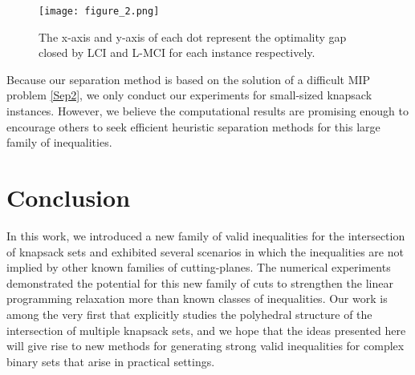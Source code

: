 \begin{figure}
    \centering
    \texttt{[image: figure\_2.png]}
    \caption{The x-axis and y-axis of each dot represent the optimality gap closed by LCI and L-MCI for each instance respectively.}
    \label{fig:lmci_lci}
\end{figure}




Because our separation method is based on the solution of a difficult MIP problem \eqref{Sep2}, we only conduct our experiments for small-sized knapsack instances.  However, we believe the computational results are promising enough to encourage others to seek efficient heuristic separation methods for this large family of inequalities.


\section{Conclusion}
In this work, we introduced a new family of valid inequalities for the intersection of knapsack sets and exhibited several scenarios in which the inequalities are not implied by other known families of cutting-planes. The numerical experiments demonstrated the potential for this new family of cuts to strengthen the linear programming relaxation more than known classes of inequalities.
Our work is among the very first that explicitly studies the polyhedral structure of the intersection of multiple knapsack sets, and we hope that the ideas presented here will give rise to new methods for generating strong valid inequalities for complex binary sets that arise in practical settings.








